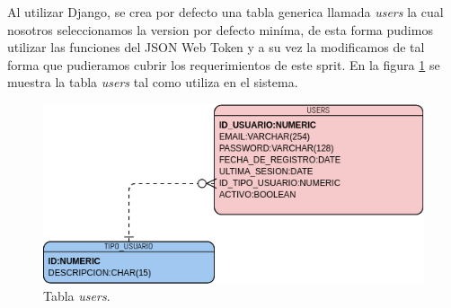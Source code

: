         Al utilizar Django, se crea por defecto una tabla generica llamada \textit{users} la cual nosotros seleccionamos
        la version por defecto miníma, de esta forma pudimos utilizar las funciones del JSON Web Token y a su vez la modificamos 
        de tal forma que pudieramos cubrir los requerimientos de este sprit.
        En la figura \ref{tbdb:users} se muestra la tabla \textit{users} tal como utiliza en el sistema. 
        \begin{figure}[H]
            \begin{center}
                \includegraphics[width=.7\textwidth]{sprints/imagenes/sp1mdd.png}
            \end{center}
            
            \caption{Tabla \textit{users}.}
            \label{tbdb:users}
        \end{figure}
    
